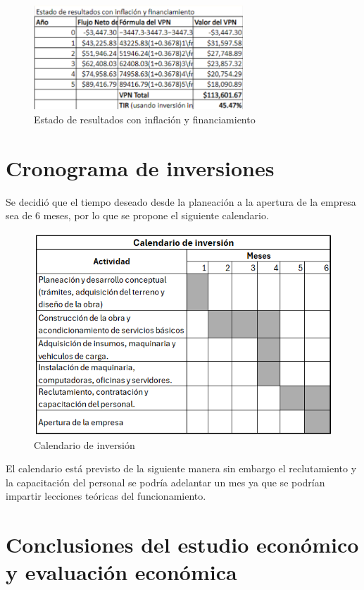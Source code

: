 \begin{figure}[H]
    \centering	
    \includegraphics[width=0.7\textwidth]{chapters/ELC_18.png} 
    \caption{Estado de resultados con inflación y financiamiento}
\label{fig:croquis190125}
\end{figure}


\section{Cronograma de inversiones}

Se decidió que el tiempo deseado desde la planeación a la apertura de la empresa sea de 6 meses, por lo que se propone el siguiente calendario. 

\begin{figure}[H]
    \centering	
    \includegraphics[width=.8\textwidth]{img/Calendario de inversion.png} 
    \caption{Calendario de inversión}
\label{fig:calendarioInversion}
\end{figure}

El calendario está previsto de la siguiente manera sin embargo el reclutamiento y la capacitación del personal se podría adelantar un mes ya que se podrían impartir lecciones teóricas del funcionamiento. 

\section{Conclusiones del estudio económico y evaluación económica}



